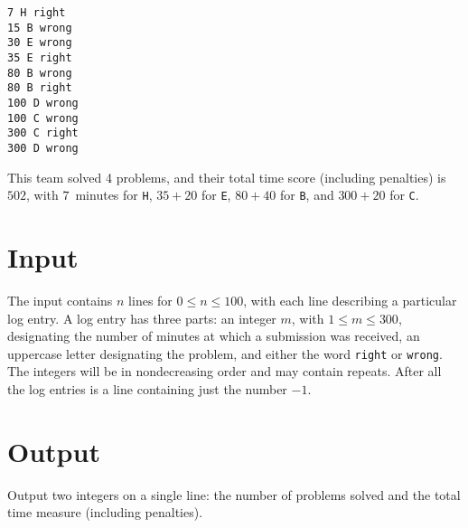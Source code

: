 \vspace{-12pt}
\begin{verbatim}
7 H right
15 B wrong
30 E wrong
35 E right
80 B wrong
80 B right
100 D wrong
100 C wrong
300 C right
300 D wrong
\end{verbatim}
\vspace{-12pt}

This team solved 4 problems, and their total time score (including
penalties) is $502$, with $7$~minutes for {\tt H}, $35+20$ for {\tt E},
$80+40$ for {\tt B}, and $300+20$ for {\tt C}.


\section*{Input}

The input contains $n$ lines for $0 \leq n \leq 100$, with each line
describing a particular log entry. A log entry has three parts:
an integer $m$, with $1 \leq m \leq 300$, designating the number of minutes at
which a submission was received, an uppercase letter designating the
problem, and either the word {\tt right} or {\tt wrong}.
The integers will be in nondecreasing order and may contain repeats.
After all the log entries is a line containing just the number $-1$.

\section*{Output}

Output two integers on a single line: the number of problems solved
and the total time measure (including penalties).
